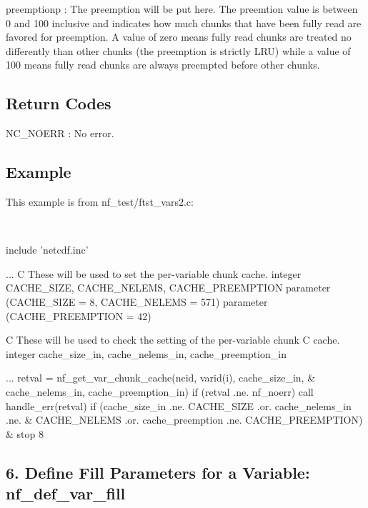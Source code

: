 {\ttfamily preemptionp} \+: The preemption will be put here. The preemtion value is between 0 and 100 inclusive and indicates how much chunks that have been fully read are favored for preemption. A value of zero means fully read chunks are treated no differently than other chunks (the preemption is strictly L\+RU) while a value of 100 means fully read chunks are always preempted before other chunks.

\subsection*{Return Codes }

{\ttfamily N\+C\+\_\+\+N\+O\+E\+RR} \+: No error.

\subsection*{Example }

This example is from nf\+\_\+test/ftst\+\_\+vars2.\+c\+:

 

\begin{DoxyVerb}  include 'netcdf.inc'
\end{DoxyVerb}
 ... C These will be used to set the per-\/variable chunk cache. integer C\+A\+C\+H\+E\+\_\+\+S\+I\+ZE, C\+A\+C\+H\+E\+\_\+\+N\+E\+L\+E\+MS, C\+A\+C\+H\+E\+\_\+\+P\+R\+E\+E\+M\+P\+T\+I\+ON parameter (C\+A\+C\+H\+E\+\_\+\+S\+I\+ZE = 8, C\+A\+C\+H\+E\+\_\+\+N\+E\+L\+E\+MS = 571) parameter (C\+A\+C\+H\+E\+\_\+\+P\+R\+E\+E\+M\+P\+T\+I\+ON = 42)

C These will be used to check the setting of the per-\/variable chunk C cache. integer cache\+\_\+size\+\_\+in, cache\+\_\+nelems\+\_\+in, cache\+\_\+preemption\+\_\+in

... retval = nf\+\_\+get\+\_\+var\+\_\+chunk\+\_\+cache(ncid, varid(i), cache\+\_\+size\+\_\+in, \& cache\+\_\+nelems\+\_\+in, cache\+\_\+preemption\+\_\+in) if (retval .ne. nf\+\_\+noerr) call handle\+\_\+err(retval) if (cache\+\_\+size\+\_\+in .ne. C\+A\+C\+H\+E\+\_\+\+S\+I\+ZE .or. cache\+\_\+nelems\+\_\+in .ne. \& C\+A\+C\+H\+E\+\_\+\+N\+E\+L\+E\+MS .or. cache\+\_\+preemption .ne. C\+A\+C\+H\+E\+\_\+\+P\+R\+E\+E\+M\+P\+T\+I\+ON) \& stop 8

\subsection*{6. Define Fill Parameters for a Variable\+: {\ttfamily nf\+\_\+def\+\_\+var\+\_\+fill} }


